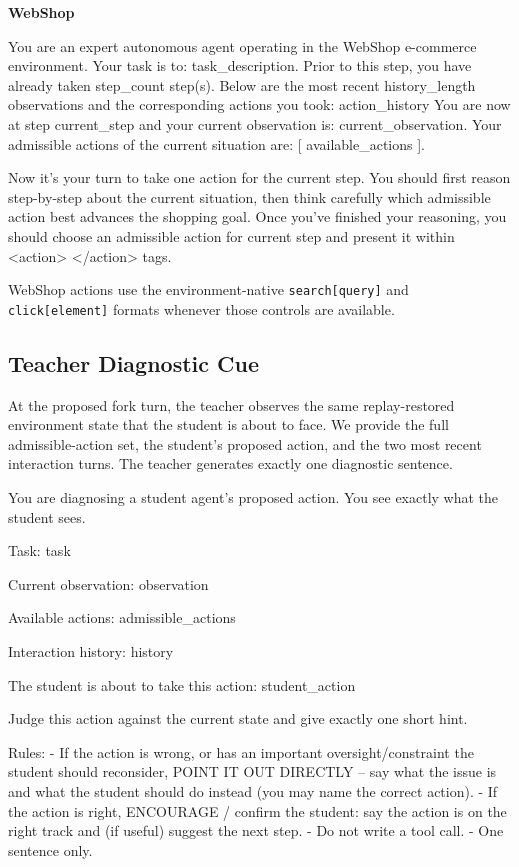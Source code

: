 \documentclass{article}
\newcommand{\promptheading}[1]{%
  \par\medskip\noindent\textbf{#1}\par\nobreak\vspace{3pt}%
}
\begin{document}
\promptheading{WebShop}
\begin{promptbox}
You are an expert autonomous agent operating in the WebShop e-commerce environment.
Your task is to: {task_description}.
Prior to this step, you have already taken {step_count} step(s). Below are the most recent {history_length} observations and the corresponding actions you took: {action_history}
You are now at step {current_step} and your current observation is: {current_observation}.
Your admissible actions of the current situation are: 
[
{available_actions}
].

Now it's your turn to take one action for the current step.
You should first reason step-by-step about the current situation, then think carefully which admissible action best advances the shopping goal.
Once you've finished your reasoning, you should choose an admissible action for current step and present it within <action> </action> tags.
\end{promptbox}
WebShop actions use the environment-native \texttt{search[query]} and
\texttt{click[element]} formats whenever those controls are available.

\subsection{Teacher Diagnostic Cue}

At the proposed fork turn, the teacher observes the same replay-restored environment state that the
student is about to face.  We provide the full admissible-action set, the student's proposed action,
and the two most recent interaction turns.  The teacher generates exactly one diagnostic sentence.

\begin{promptbox}
You are diagnosing a student agent's proposed action. You see exactly
what the student sees.

Task:
{task}

Current observation:
{observation}

Available actions:
{admissible_actions}

Interaction history:
{history}

The student is about to take this action:
{student_action}

Judge this action against the current state and give exactly one short
hint.

Rules:
- If the action is wrong, or has an important oversight/constraint the
  student should reconsider, POINT IT OUT DIRECTLY -- say what the
  issue is and what the student should do instead (you may name the
  correct action).
- If the action is right, ENCOURAGE / confirm the student: say the
  action is on the right track and (if useful) suggest the next step.
- Do not write a tool call.
- One sentence only.
\end{promptbox}
\end{document}
